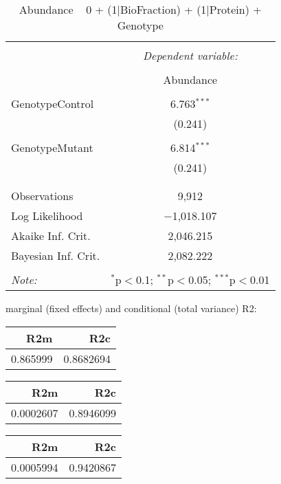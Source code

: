 \documentclass[11pt]{report}
\begin{document}
\begin{table}[!htbp] \centering 
  \caption{Abundance ~ 0 + (1|BioFraction) + (1|Protein) + Genotype} 
  \label{} 
\begin{tabular}{@{\extracolsep{5pt}}lc} 
\\[-1.8ex]\hline 
\hline \\[-1.8ex] 
 & \multicolumn{1}{c}{\textit{Dependent variable:}} \\ 
\cline{2-2} 
\\[-1.8ex] & Abundance \\ 
\hline \\[-1.8ex] 
 GenotypeControl & 6.763$^{***}$ \\ 
  & (0.241) \\ 
  & \\ 
 GenotypeMutant & 6.814$^{***}$ \\ 
  & (0.241) \\ 
  & \\ 
\hline \\[-1.8ex] 
Observations & 9,912 \\ 
Log Likelihood & $-$1,018.107 \\ 
Akaike Inf. Crit. & 2,046.215 \\ 
Bayesian Inf. Crit. & 2,082.222 \\ 
\hline 
\hline \\[-1.8ex] 
\textit{Note:}  & \multicolumn{1}{r}{$^{*}$p$<$0.1; $^{**}$p$<$0.05; $^{***}$p$<$0.01} \\ 
\end{tabular} 
\end{table} 
marginal (fixed effects) and conditional (total variance) R2:

\begin{tabular}{r|r}
\hline
R2m & R2c\\
\hline
0.865999 & 0.8682694\\
\hline
\end{tabular}

\begin{tabular}{r|r}
\hline
R2m & R2c\\
\hline
0.0002607 & 0.8946099\\
\hline
\end{tabular}

\begin{tabular}{r|r}
\hline
R2m & R2c\\
\hline
0.0005994 & 0.9420867\\
\hline
\end{tabular}
\end{document}

